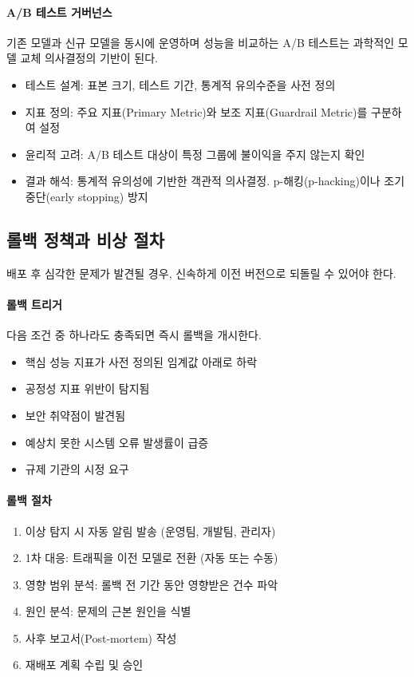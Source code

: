 \paragraph{A/B 테스트 거버넌스}
기존 모델과 신규 모델을 동시에 운영하며 성능을 비교하는 A/B 테스트는 과학적인 모델 교체 의사결정의 기반이 된다.
\begin{itemize}
  \item 테스트 설계: 표본 크기, 테스트 기간, 통계적 유의수준을 사전 정의
  \item 지표 정의: 주요 지표(Primary Metric)와 보조 지표(Guardrail Metric)를 구분하여 설정
  \item 윤리적 고려: A/B 테스트 대상이 특정 그룹에 불이익을 주지 않는지 확인
  \item 결과 해석: 통계적 유의성에 기반한 객관적 의사결정. p-해킹(p-hacking)이나 조기 중단(early stopping) 방지
\end{itemize}

\subsection{롤백 정책과 비상 절차}
\label{sec:10.6.4}

배포 후 심각한 문제가 발견될 경우, 신속하게 이전 버전으로 되돌릴 수 있어야 한다.

\paragraph{롤백 트리거}
다음 조건 중 하나라도 충족되면 즉시 롤백을 개시한다.
\begin{itemize}
  \item 핵심 성능 지표가 사전 정의된 임계값 아래로 하락
  \item 공정성 지표 위반이 탐지됨
  \item 보안 취약점이 발견됨
  \item 예상치 못한 시스템 오류 발생률이 급증
  \item 규제 기관의 시정 요구
\end{itemize}

\paragraph{롤백 절차}
\begin{enumerate}
  \item 이상 탐지 시 자동 알림 발송 (운영팀, 개발팀, 관리자)
  \item 1차 대응: 트래픽을 이전 모델로 전환 (자동 또는 수동)
  \item 영향 범위 분석: 롤백 전 기간 동안 영향받은 건수 파악
  \item 원인 분석: 문제의 근본 원인을 식별
  \item 사후 보고서(Post-mortem) 작성
  \item 재배포 계획 수립 및 승인
\end{enumerate}

